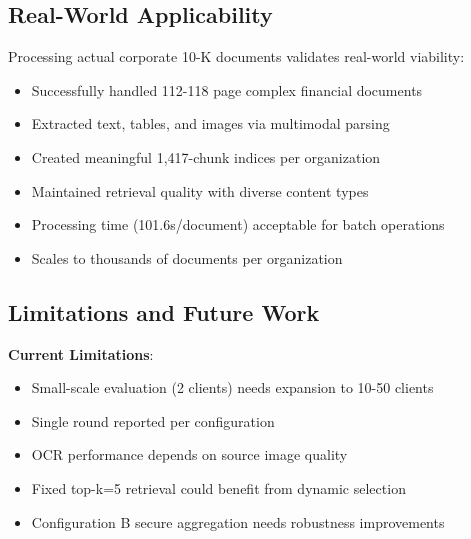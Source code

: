 \documentclass[conference]{IEEEtran}
\begin{document}
\subsection{Real-World Applicability}

Processing actual corporate 10-K documents validates real-world viability:
\begin{itemize}
    \item Successfully handled 112-118 page complex financial documents
    \item Extracted text, tables, and images via multimodal parsing
    \item Created meaningful 1,417-chunk indices per organization
    \item Maintained retrieval quality with diverse content types
    \item Processing time (101.6s/document) acceptable for batch operations
    \item Scales to thousands of documents per organization
\end{itemize}

\subsection{Limitations and Future Work}

\textbf{Current Limitations}:
\begin{itemize}
    \item Small-scale evaluation (2 clients) needs expansion to 10-50 clients
    \item Single round reported per configuration
    \item OCR performance depends on source image quality
    \item Fixed top-k=5 retrieval could benefit from dynamic selection
    \item Configuration B secure aggregation needs robustness improvements
\end{itemize}
\end{document}
